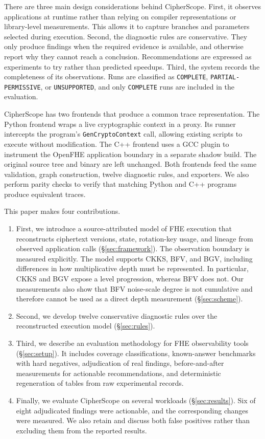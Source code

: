 \documentclass[sigconf,nonacm]{acmart}
\begin{document}
There are three main design considerations behind CipherScope. First, it
observes applications at runtime rather than relying on compiler
representations or library-level measurements. This allows it to capture
branches and parameters selected during execution. Second, the diagnostic
rules are conservative. They only produce findings when the required evidence
is available, and otherwise report why they cannot reach a conclusion.
Recommendations are expressed as experiments to try rather than predicted
speedups. Third, the system records the completeness of its observations.
Runs are classified as \texttt{COMPLETE}, \texttt{PARTIAL-PERMISSIVE}, or
\texttt{UNSUPPORTED}, and only \texttt{COMPLETE} runs are included in the
evaluation.

CipherScope has two frontends that produce a common trace representation. The
Python frontend wraps a live cryptographic context in a proxy. Its runner
intercepts the program's \texttt{GenCryptoContext} call, allowing existing
scripts to execute without modification. The C++ frontend uses a GCC plugin
to instrument the OpenFHE application boundary in a separate shadow build.
The original source tree and binary are left unchanged. Both frontends feed
the same validation, graph construction, twelve diagnostic rules, and
exporters. We also perform parity checks to verify that matching Python and
C++ programs produce equivalent traces.

This paper makes four contributions.

\begin{enumerate}
\item First, we introduce a source-attributed model of FHE execution that
  reconstructs ciphertext versions, state, rotation-key usage, and lineage
  from observed application calls (\S\ref{sec:framework}). The observation
  boundary is measured explicitly. The model supports CKKS, BFV, and BGV,
  including differences in how multiplicative depth must be represented. In
  particular, CKKS and BGV expose a level progression, whereas BFV does not.
  Our measurements also show that BFV noise-scale degree is not cumulative
  and therefore cannot be used as a direct depth measurement
  (\S\ref{sec:scheme}).
\item Second, we develop twelve conservative diagnostic rules over the
  reconstructed execution model (\S\ref{sec:rules}).
\item Third, we describe an evaluation methodology for FHE observability
  tools (\S\ref{sec:setup}). It includes coverage classifications,
  known-answer benchmarks with hard negatives, adjudication of real findings,
  before-and-after measurements for actionable recommendations, and
  deterministic regeneration of tables from raw experimental records.
\item Finally, we evaluate CipherScope on several workloads
  (\S\ref{sec:results}). Six of eight adjudicated findings were actionable,
  and the corresponding changes were measured. We also retain and discuss
  both false positives rather than excluding them from the reported results.
\end{enumerate}
\end{document}
